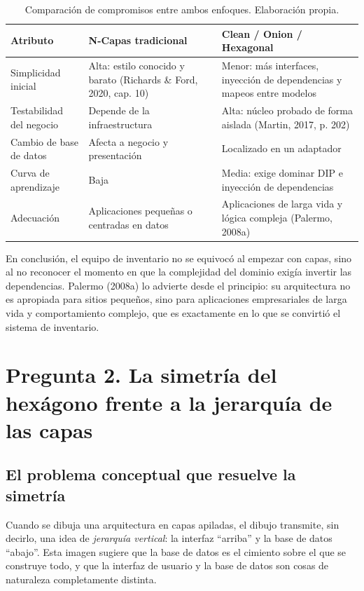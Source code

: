 \documentclass[11pt,a4paper]{article}
\begin{document}
\begin{table}[htbp]
\centering
\small
\renewcommand{\arraystretch}{1.3}
\begin{tabularx}{\textwidth}{>{\raggedright\arraybackslash}p{3.2cm} >{\raggedright\arraybackslash}X >{\raggedright\arraybackslash}X}
\toprule
\textbf{Atributo} & \textbf{N-Capas tradicional} & \textbf{Clean / Onion / Hexagonal} \\
\midrule
Simplicidad inicial & Alta: estilo conocido y barato (Richards \& Ford, 2020, cap. 10) & Menor: más interfaces, inyección de dependencias y mapeos entre modelos \\
Testabilidad del negocio & Depende de la infraestructura & Alta: núcleo probado de forma aislada (Martin, 2017, p. 202) \\
Cambio de base de datos & Afecta a negocio y presentación & Localizado en un adaptador \\
Curva de aprendizaje & Baja & Media: exige dominar DIP e inyección de dependencias \\
Adecuación & Aplicaciones pequeñas o centradas en datos & Aplicaciones de larga vida y lógica compleja (Palermo, 2008a) \\
\bottomrule
\end{tabularx}
\caption{Comparación de compromisos entre ambos enfoques. Elaboración propia.}
\end{table}

En conclusión, el equipo de inventario no se equivocó al empezar con capas, sino al no reconocer el momento en que la complejidad del dominio exigía invertir las dependencias. Palermo (2008a) lo advierte desde el principio: su arquitectura no es apropiada para sitios pequeños, sino para aplicaciones empresariales de larga vida y comportamiento complejo, que es exactamente en lo que se convirtió el sistema de inventario.

\section{Pregunta 2. La simetría del hexágono frente a la jerarquía de las capas}

\subsection{El problema conceptual que resuelve la simetría}

Cuando se dibuja una arquitectura en capas apiladas, el dibujo transmite, sin decirlo, una idea de \emph{jerarquía vertical}: la interfaz ``arriba'' y la base de datos ``abajo''. Esta imagen sugiere que la base de datos es el cimiento sobre el que se construye todo, y que la interfaz de usuario y la base de datos son cosas de naturaleza completamente distinta.
\end{document}
